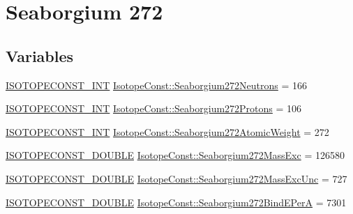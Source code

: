 \hypertarget{group___isotope_const-_seaborgium-_sg272}{}\section{Seaborgium 272}
\label{group___isotope_const-_seaborgium-_sg272}
\subsection*{Variables}
\begin{DoxyCompactItemize}
\item 
\mbox{\hyperlink{group___isotope_const-_macros_ga5f18360b3e99483a35c32d789e62621c}{I\+S\+O\+T\+O\+P\+E\+C\+O\+N\+S\+T\+\_\+\+I\+NT}} \mbox{\hyperlink{group___isotope_const-_seaborgium-_sg272_gadeacb127b2abc1451a3428bf0a27f9e9}{Isotope\+Const\+::\+Seaborgium272\+Neutrons}} = 166
\item 
\mbox{\hyperlink{group___isotope_const-_macros_ga5f18360b3e99483a35c32d789e62621c}{I\+S\+O\+T\+O\+P\+E\+C\+O\+N\+S\+T\+\_\+\+I\+NT}} \mbox{\hyperlink{group___isotope_const-_seaborgium-_sg272_ga025889fbb3b3b1a7c61e3b85362ad036}{Isotope\+Const\+::\+Seaborgium272\+Protons}} = 106
\item 
\mbox{\hyperlink{group___isotope_const-_macros_ga5f18360b3e99483a35c32d789e62621c}{I\+S\+O\+T\+O\+P\+E\+C\+O\+N\+S\+T\+\_\+\+I\+NT}} \mbox{\hyperlink{group___isotope_const-_seaborgium-_sg272_ga2ed821c10fb0a9ccc203ee2ac43906ee}{Isotope\+Const\+::\+Seaborgium272\+Atomic\+Weight}} = 272
\item 
\mbox{\hyperlink{group___isotope_const-_macros_ga8f45a7272ce02c0b4c65c44636ed719a}{I\+S\+O\+T\+O\+P\+E\+C\+O\+N\+S\+T\+\_\+\+D\+O\+U\+B\+LE}} \mbox{\hyperlink{group___isotope_const-_seaborgium-_sg272_ga0f2dbd10783e07f8515c783f8fe9ca41}{Isotope\+Const\+::\+Seaborgium272\+Mass\+Exc}} = 126580
\item 
\mbox{\hyperlink{group___isotope_const-_macros_ga8f45a7272ce02c0b4c65c44636ed719a}{I\+S\+O\+T\+O\+P\+E\+C\+O\+N\+S\+T\+\_\+\+D\+O\+U\+B\+LE}} \mbox{\hyperlink{group___isotope_const-_seaborgium-_sg272_gaf8d1fd1bdad900869b13b36d7cab6c80}{Isotope\+Const\+::\+Seaborgium272\+Mass\+Exc\+Unc}} = 727
\item 
\mbox{\hyperlink{group___isotope_const-_macros_ga8f45a7272ce02c0b4c65c44636ed719a}{I\+S\+O\+T\+O\+P\+E\+C\+O\+N\+S\+T\+\_\+\+D\+O\+U\+B\+LE}} \mbox{\hyperlink{group___isotope_const-_seaborgium-_sg272_ga97f8f6be0e4da7f878bdc39344204aa3}{Isotope\+Const\+::\+Seaborgium272\+Bind\+E\+PerA}} = 7301
\item 

\end{DoxyCompactItemize}
